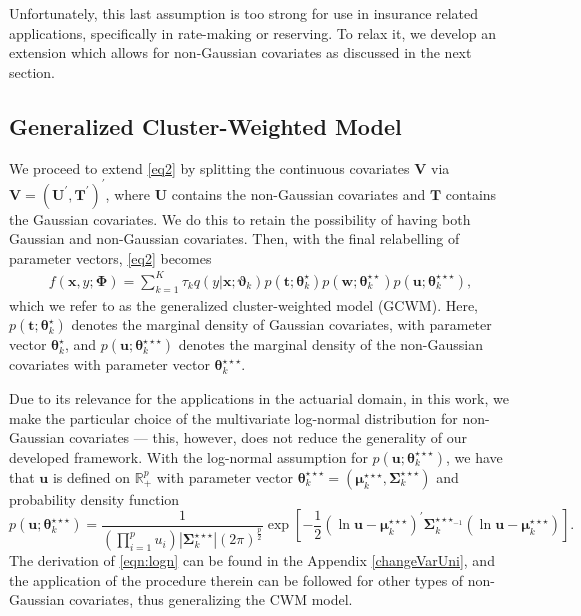 \documentclass[12pt,letterpaper]{article}
\numberwithin{equation}{section}
\numberwithin{equation}{section}
\numberwithin{equation}{section}
\begin{document}
Unfortunately, this last assumption is too strong for use in insurance related applications, specifically in rate-making or reserving. To relax it, we develop an extension which allows for non-Gaussian covariates as discussed in the next section.

\subsection{Generalized Cluster-Weighted Model}
We proceed to extend \eqref{eq2} by splitting the continuous covariates $\bm{V}$ via $\bm{V}=(\bm U^{'}, \bm T^{'})^{'}$, where $\bm{U}$ contains the non-Gaussian covariates and $\bm{T}$ contains the Gaussian covariates. We do this to retain the possibility of having both Gaussian and non-Gaussian covariates. Then, with the final relabelling of parameter vectors, \eqref{eq2} becomes
\begin{align}
 f(\bm x, y; \bm{\Phi})= \sum_{k=1}^{K} \tau_k q(y|\bm{x};\bm{\vartheta}_k)p(\bm{t};\bm{\theta}_k^{\star})p(\bm{w};\bm{\theta}_k^{\star\star})p(\bm{u};\bm{\theta}_k^{\star\star\star}),
\label{eq3}
\end{align}
which we refer to as the generalized cluster-weighted model (GCWM). Here, $p(\bm{t};\bm{\theta}_k^{\star})$ denotes the marginal density of Gaussian covariates, with parameter vector $\bm{\theta}^{\star}_k$, and $p(\bm{u};\bm{\theta}_k^{\star\star\star})$ denotes the marginal density of the non-Gaussian covariates with parameter vector $ \bm{ \theta}_k^{\star\star\star} $.


Due to its relevance for the applications in the actuarial domain, in this work, we make the particular choice of the multivariate log-normal distribution  for non-Gaussian covariates --- this, however, does not reduce the generality of our developed framework. With the log-normal assumption for $p(\bm{u};\bm{\theta}_k^{\star\star\star})$, we have that $\bm{u}$ is defined on $\mathbb{R}^p_+$ with parameter vector $\bm{\theta}_k^{\star\star\star}= (\bm{\mu}_k^{\star\star\star} ,\bm{\Sigma}_k^{\star\star\star})$ and probability density function
\begin{equation}\label{eqn:logn} 
p \left(  \bm{u}; \bm{\theta}_k^{\star\star\star} \right) = \frac{1}{(\prod_{i=1}^{p}u_{i})|\bm{ \Sigma}_k^{\star\star\star} |(2 \pi)^{\frac{p}{2}}}   \exp\left[-\frac{1}{2}(\ln\bm{ u}-\bm{\mu}_k^{\star\star\star})^{'}\bm{\Sigma}_k^{{\star\star\star}_{-1}}(\ln \bm {u}-\bm{\mu}_k^{\star\star\star})\right].
\end{equation} The derivation of \eqref{eqn:logn} can be found in the Appendix \ref{changeVarUni}, and the application of the procedure therein can be followed for other types of non-Gaussian covariates, thus generalizing the CWM model.
\end{document}
